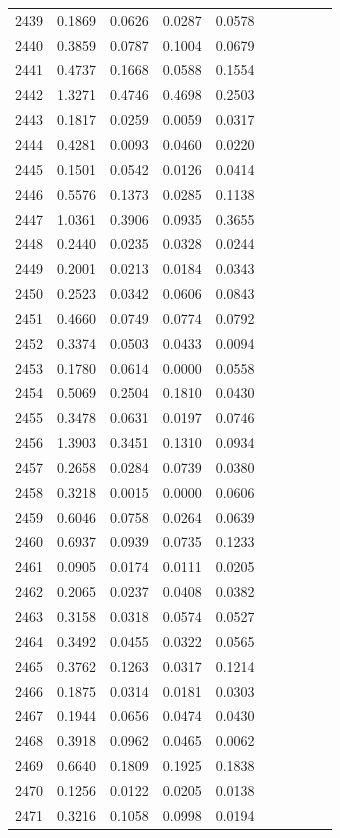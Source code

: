 \begin{table}
\begin{tabular}{cccccccccc}
2439& 0.1869& 0.0626& 0.0287& 0.0578\\ 
2440& 0.3859& 0.0787& 0.1004& 0.0679\\ 
2441& 0.4737& 0.1668& 0.0588& 0.1554\\ 
2442& 1.3271& 0.4746& 0.4698& 0.2503\\ 
2443& 0.1817& 0.0259& 0.0059& 0.0317\\ 
2444& 0.4281& 0.0093& 0.0460& 0.0220\\ 
2445& 0.1501& 0.0542& 0.0126& 0.0414\\ 
2446& 0.5576& 0.1373& 0.0285& 0.1138\\ 
2447& 1.0361& 0.3906& 0.0935& 0.3655\\ 
2448& 0.2440& 0.0235& 0.0328& 0.0244\\ 
2449& 0.2001& 0.0213& 0.0184& 0.0343\\ 
2450& 0.2523& 0.0342& 0.0606& 0.0843\\ 
2451& 0.4660& 0.0749& 0.0774& 0.0792\\ 
2452& 0.3374& 0.0503& 0.0433& 0.0094\\ 
2453& 0.1780& 0.0614& 0.0000& 0.0558\\ 
2454& 0.5069& 0.2504& 0.1810& 0.0430\\ 
2455& 0.3478& 0.0631& 0.0197& 0.0746\\ 
2456& 1.3903& 0.3451& 0.1310& 0.0934\\ 
2457& 0.2658& 0.0284& 0.0739& 0.0380\\ 
2458& 0.3218& 0.0015& 0.0000& 0.0606\\ 
2459& 0.6046& 0.0758& 0.0264& 0.0639\\ 
2460& 0.6937& 0.0939& 0.0735& 0.1233\\ 
2461& 0.0905& 0.0174& 0.0111& 0.0205\\ 
2462& 0.2065& 0.0237& 0.0408& 0.0382\\ 
2463& 0.3158& 0.0318& 0.0574& 0.0527\\ 
2464& 0.3492& 0.0455& 0.0322& 0.0565\\ 
2465& 0.3762& 0.1263& 0.0317& 0.1214\\ 
2466& 0.1875& 0.0314& 0.0181& 0.0303\\ 
2467& 0.1944& 0.0656& 0.0474& 0.0430\\ 
2468& 0.3918& 0.0962& 0.0465& 0.0062\\ 
2469& 0.6640& 0.1809& 0.1925& 0.1838\\ 
2470& 0.1256& 0.0122& 0.0205& 0.0138\\ 
2471& 0.3216& 0.1058& 0.0998& 0.0194\\ 

\end{tabular}
\end{table}
